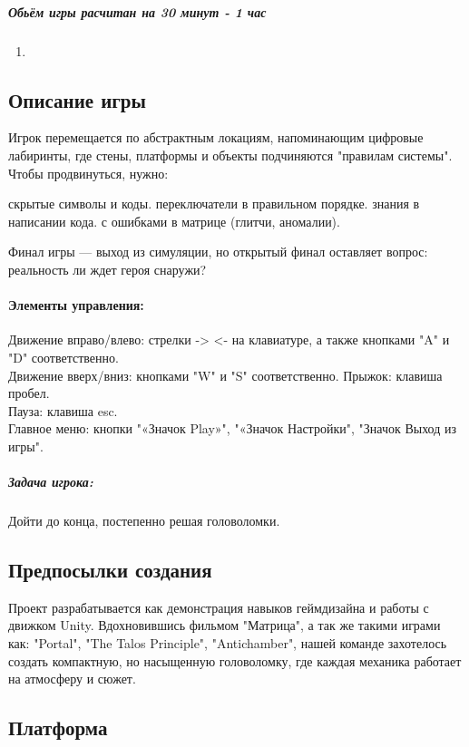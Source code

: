 \documentclass{article}
\begin{document}
\subparagraph{Обьём игры расчитан на 30 минут - 1 час}
\begin{enumerate}
    \item 
\end{enumerate}

\subsection{Описание игры}
Игрок перемещается по абстрактным локациям, напоминающим цифровые лабиринты, где стены, платформы и объекты подчиняются "правилам системы". Чтобы продвинуться, нужно:
\begin{enumerate}
 скрытые символы и коды.
 переключатели в правильном порядке.
 знания в написании кода.
 с ошибками в матрице (глитчи, аномалии).
\end{enumerate}
Финал игры — выход из симуляции, но открытый финал оставляет вопрос: реальность ли ждет героя снаружи?
\paragraph{Элементы управления:}
Движение вправо/влево: стрелки -> <- на клавиатуре, а также кнопками "A" и "D" соответственно.\\
Движение вверх/вниз: кнопками "W" и "S" соответственно.
  Прыжок: клавиша пробел.\\
    Пауза: клавиша esc.\\
      Главное меню: кнопки "«Значок Play»", "«Значок Настройки", "Значок Выход из игры".

\subparagraph{Задача игрока:} Дойти до конца, постепенно решая головоломки.

\subsection{Предпосылки создания}
Проект разрабатывается как демонстрация навыков геймдизайна и работы с движком Unity. Вдохновившись фильмом "Матрица", а так же такими играми как:  "Portal", "The Talos Principle", "Antichamber", нашей команде захотелось создать компактную, но насыщенную головоломку, где каждая механика работает на атмосферу и сюжет.

\subsection{Платформа}
\end{document}
